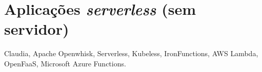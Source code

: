 






\section{Aplicações \emph{serverless} (sem servidor)}
  Claudia, Apache Openwhisk, Serverless, Kubeless, IronFunctions, AWS Lambda, OpenFaaS, Microsoft Azure Functions.

